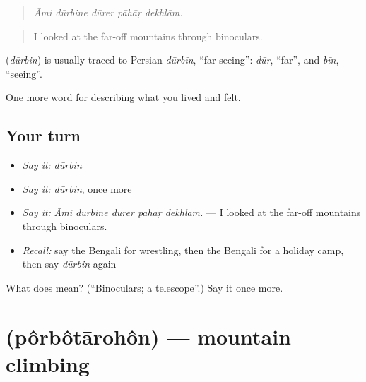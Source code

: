 \begin{quote}
    
\end{quote}

\begin{quote}
\emph{Āmi dūrbine dūrer pāhāṛ dekhlām.}
\end{quote}

\begin{quote}
I looked at the far-off mountains through binoculars.
\end{quote}

\begin{cousinweb}
\textbf{} (\emph{dūrbin}) is usually traced to Persian \emph{dūrbīn}, \textquotedblleft{}far-seeing\textquotedblright{}: \emph{dūr}, \textquotedblleft{}far\textquotedblright{}, and \emph{bīn}, \textquotedblleft{}seeing\textquotedblright{}.
\end{cousinweb}

\begin{grammarlens}[title={What you've built}]
One more word for describing what you lived and felt.
\end{grammarlens}

\subsection*{Your turn}
\begin{itemize}
\raggedright
  \item \emph{Say it:} \emph{dūrbin}
  \item \emph{Say it:} \emph{dūrbin}, once more
  \item \emph{Say it:} \emph{Āmi dūrbine dūrer pāhāṛ dekhlām.} — I looked at the far-off mountains through binoculars.
  \item \emph{Recall:} say the Bengali for wrestling, then the Bengali for a holiday camp, then say \emph{dūrbin} again
\end{itemize}

\begin{tcolorbox}[breakable,colback=teal!4,colframe=teal!35!black,title={Before you move on}]
What does  mean? (\textquotedblleft{}Binoculars; a telescope\textquotedblright{}.) Say it once more.
\end{tcolorbox}
\section[\texorpdfstring{\bn{পর্বতারোহণ} (pôrbôtārohôn)}{পর্বতারোহণ (pôrbôtārohôn)}]{ (pôrbôtārohôn) — mountain climbing}

